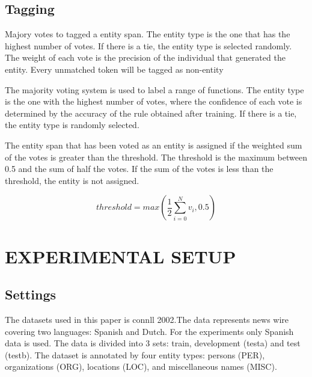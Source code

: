 \subsection{Tagging}


Majory votes to tagged a entity span. The entity type is the one that has the highest number of votes. If there is a tie, the entity type is selected randomly. The weight of each vote is the precision of the individual that generated the entity. Every  unmatched  token  will  be  tagged  as  non-entity

The majority voting system is used to label a range of functions. The entity type is the one with the highest number of votes, where the confidence of each vote is determined by the accuracy of the rule obtained after training. If there is a tie, the entity type is randomly selected.

The entity span that has been voted as an entity is assigned if the weighted sum of the votes is greater than the threshold. The threshold is the maximum between 0.5 and the sum of half the votes. If the sum of the votes is less than the threshold, the entity is not assigned.


\begin{equation}
  \label{threshold_eq}
  threshold = max(\frac{1}{2} \sum_{i=0}^{N} v_i, 0.5)
\end{equation}


\section{EXPERIMENTAL SETUP}

\subsection{Settings}

The datasets used in this paper is connll 2002\cite{tjong-kim-sang-2002-introduction}.The data represents news wire covering two languages: Spanish and Dutch. For the experiments only Spanish data is used. The data is divided into 3 sets: train, development (testa) and test (testb). The dataset is annotated by four entity types: persons (PER), organizations (ORG), locations (LOC), and miscellaneous names (MISC).

